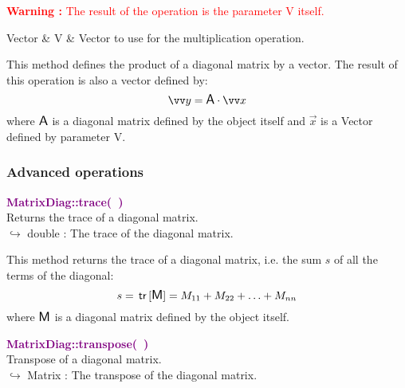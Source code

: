 \hspace*{10mm}\textcolor{red}{\textbf{Warning :}  The result of the operation is the parameter V itself.}

\begin{tcolorbox}[width=\textwidth,myArgs,tabularx={ll|R}]
Vector & V & Vector to use for the multiplication operation.
\end{tcolorbox}

This method defines the product of a diagonal matrix by a vector.
The result of this operation is also a vector defined by:
\begin{equation*}
\overrightarrow{y} = \A \cdot \overrightarrow{x}
\end{equation*}
where $\mbox{\large\ensuremath{\mathsf{A}}}$ is a diagonal matrix defined by the object itself and $\overrightarrow{x}$ is a Vector defined by parameter V.

\subsubsection{Advanced operations}

\textcolor{purple}{\textbf{MatrixDiag::trace(~)}}\label{MatrixDiag::trace()}\\
Returns the trace of a diagonal matrix.\\ \hspace*{10mm}$\hookrightarrow$ double : The trace of the diagonal matrix.

This method returns the trace of a diagonal matrix, i.e. the sum $s$ of all the terms of the diagonal:
\begin{equation*}
s = \mbox{\ensuremath{\mathsf{\,tr\,}}}[\mbox{\large\ensuremath{\mathsf{M}}}] = M_{11}+M_{22}+\hdots+M_{nn}
\end{equation*}
where $\mbox{\large\ensuremath{\mathsf{M}}}$ is a diagonal matrix defined by the object itself.

\textcolor{purple}{\textbf{MatrixDiag::transpose(~)}}\label{MatrixDiag::transpose()}\\
Transpose of a diagonal matrix.\\ \hspace*{10mm}$\hookrightarrow$ Matrix : The transpose of the diagonal matrix.

